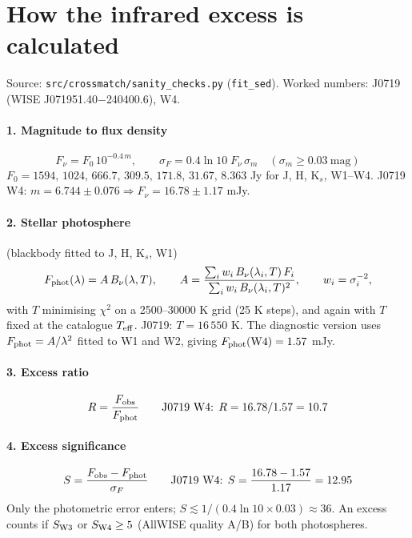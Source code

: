 \documentclass[11pt]{article}
\begin{document}
\section*{How the infrared excess is calculated}
Source: \texttt{src/crossmatch/sanity_checks.py} (\texttt{fit\_sed}). Worked numbers: J0719 (WISE J071951.40$-$240400.6), W4.

\paragraph{1. Magnitude to flux density}
\begin{equation}
F_\nu = F_0\,10^{-0.4\,m}, \qquad \sigma_F = 0.4\ln 10\;F_\nu\,\sigma_m \quad (\sigma_m \ge 0.03\ \text{mag})
\end{equation}
$F_0 = 1594,\,1024,\,666.7,\,309.5,\,171.8,\,31.67,\,8.363$ Jy for J, H, K$_s$, W1--W4.
J0719 W4: $m = 6.744 \pm 0.076 \Rightarrow F_\nu = 16.78 \pm 1.17$ mJy.

\paragraph{2. Stellar photosphere} (blackbody fitted to J, H, K$_s$, W1)
\begin{equation}
F_{\rm phot}(\lambda) = A\,B_\nu(\lambda,T), \qquad
A = \frac{\sum_i w_i\,B_\nu(\lambda_i,T)\,F_i}{\sum_i w_i\,B_\nu(\lambda_i,T)^2}, \qquad w_i = \sigma_i^{-2},
\end{equation}
with $T$ minimising $\chi^2$ on a 2500--30000 K grid (25 K steps), and again with $T$ fixed at the catalogue
$T_{\rm eff}$. J0719: $T = 16\,550$ K. The diagnostic version uses $F_{\rm phot} = A/\lambda^2$ fitted to W1 and W2,
giving $F_{\rm phot}({\rm W4}) = 1.57$ mJy.

\paragraph{3. Excess ratio}
\begin{equation}
R = \frac{F_{\rm obs}}{F_{\rm phot}} \qquad \text{J0719 W4: } R = 16.78/1.57 = 10.7
\end{equation}

\paragraph{4. Excess significance}
\begin{equation}
S = \frac{F_{\rm obs} - F_{\rm phot}}{\sigma_F} \qquad \text{J0719 W4: } S = \frac{16.78 - 1.57}{1.17} = 12.95
\end{equation}
Only the photometric error enters; $S \lesssim 1/(0.4\ln 10 \times 0.03) \approx 36$. An excess counts if $S_{\rm W3}$ or
$S_{\rm W4} \ge 5$ (AllWISE quality A/B) for both photospheres.
\end{document}
